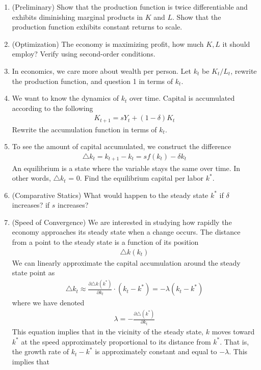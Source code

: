 \documentclass[10pt,a4paper]{book}
\theoremstyle{definition}\newtheorem{definition}{Definition}
\theoremstyle{definition}\newtheorem{fact}{Fact}
\theoremstyle{definition}\newtheorem{ex}{Ex.}
\theoremstyle{definition}\newtheorem{project}{Project}
\theoremstyle{definition}\newtheorem{problem}{Problem}
\theoremstyle{definition}\newtheorem{example}{Example}
\numberwithin{theorem}{chapter}
\numberwithin{corollary}{chapter}
\numberwithin{assumption}{chapter}
\numberwithin{definition}{chapter}
\numberwithin{prop}{chapter}
\numberwithin{notation}{chapter}
\numberwithin{problem}{chapter}
\numberwithin{example}{chapter}
\numberwithin{fact}{chapter}
\numberwithin{ex}{chapter}
\begin{document}
	\begin{enumerate}
		\item (Preliminary) Show that the production function is twice differentiable and exhibits diminishing marginal products in $K$ and $L$. Show that the production function exhibits constant returns to scale.
		\item (Optimization) The economy is maximizing profit, how much $K, L$ it should employ? Verify using second-order conditions.
		\item In economics, we care more about wealth per person. Let $k_t$ be $K_t/L_t$, rewrite the production function, and question 1 in terms of $k_t$.
		\item We want to know the dynamics of $k_t$ over time. Capital is accumulated according to the following
		\begin{align*}
			K_{t+1} = s Y_t + (1-\delta) K_t 
		\end{align*}
		Rewrite the accumulation function in terms of $k_t$.
		\item To see the amount of capital accumulated, we construct the difference 
		\begin{align}
			\triangle k_t = k_{t+1} - k_t = sf(k_t) - \delta k_t
		\end{align}
		An equilibrium is a state where the variable stays the same over time. In other words, $\triangle k_t$ = 0. Find the equilibrium capital per labor $k^*$.
		\item (Comparative Statics) What would happen to the steady state $k^*$ if $\delta$ increases? if $s$ increases?
		\item (Speed of Convergence) We are interested in studying how rapidly the economy approaches its steady state when a change occurs. The distance from a point to the steady state is a function of its position
		\begin{align*}
			\triangle k (k_t)
		\end{align*}
		We can linearly approximate the capital accumulation around the steady state point as
		\begin{align*}
			\triangle k_{t} \approx \frac{ \partial \triangle k (k^*)}{\partial k_t} \cdot (k_t - k^*) = - \lambda (k_t - k^*)
		\end{align*}
		where we have denoted
		\begin{align*}
			\lambda = - \frac{\partial \triangle(k^*)}{\partial k_t}
		\end{align*}
		This equation implies that in the vicinity of the steady state, $k$ moves toward $k^*$ at the speed approximately proportional to its distance from $k^*$. That is, the growth rate of $k_t - k^*$ is approximately constant and equal to $-\lambda$. This implies that

\end{enumerate}
\end{document}
